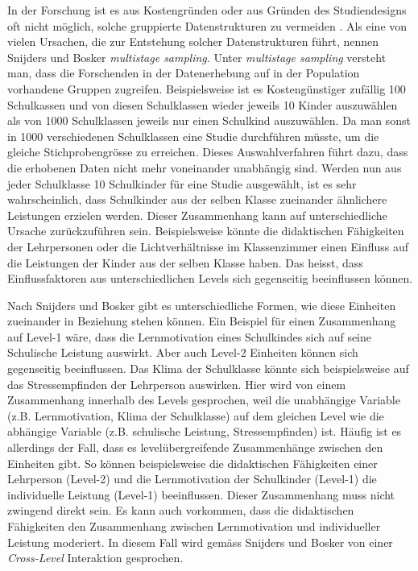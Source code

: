 \documentclass[12pt]{article}\usepackage[]{graphicx}\usepackage[]{color}
\numberwithin{equation}{section}
\begin{document}
In der Forschung ist es aus Kostengründen oder aus Gründen des Studiendesigns oft nicht möglich, solche gruppierte Datenstrukturen zu vermeiden \citep{SnijdersTomA.B2012Ma:a, woltman2012introduction}. Als eine von vielen Ursachen, die zur Entstehung solcher Datenstrukturen führt, nennen Snijders und Bosker \citeyearpar{SnijdersTomA.B2012Ma:a} \textit{multistage sampling}. Unter \textit{multistage sampling} versteht man, dass die Forschenden in der Datenerhebung auf in der Population vorhandene Gruppen zugreifen. Beispielsweise ist es Kostengünstiger zufällig 100 Schulkassen und von diesen Schulklassen wieder jeweils 10 Kinder auszuwählen als von 1000 Schulklassen jeweils nur einen Schulkind auszuwählen. Da man sonst in 1000 verschiedenen Schulklassen eine Studie durchführen müsste, um die gleiche Stichprobengrösse zu erreichen. Dieses Auswahlverfahren führt dazu, dass die erhobenen Daten nicht mehr voneinander unabhängig sind. Werden nun aus jeder Schulklasse 10 Schulkinder für eine Studie ausgewählt, ist es sehr wahrscheinlich, dass Schulkinder aus der selben Klasse zueinander ähnlichere Leistungen erzielen werden. Dieser Zusammenhang kann auf unterschiedliche Ursache zurückzuführen sein. Beispielsweise könnte die didaktischen Fähigkeiten der Lehrpersonen oder die Lichtverhältnisse im Klassenzimmer einen Einfluss auf die Leistungen der Kinder aus der selben Klasse haben. Das heisst, dass Einflussfaktoren aus unterschiedlichen Levels sich gegenseitig beeinflussen können. 

Nach Snijders und Bosker \citeyearpar{SnijdersTomA.B2012Ma:a} gibt es unterschiedliche Formen, wie diese Einheiten zueinander in Beziehung stehen können. Ein Beispiel für einen Zusammenhang auf Level-1 wäre, dass die Lernmotivation eines Schulkindes sich auf seine Schulische Leistung auswirkt. Aber auch Level-2 Einheiten können sich gegenseitig beeinflussen. Das Klima der Schulklasse könnte sich beispielsweise auf das Stressempfinden der Lehrperson auswirken. Hier wird von einem Zusammenhang innerhalb des Levels gesprochen, weil die unabhängige Variable (z.B. Lernmotivation, Klima der Schulklasse) auf dem gleichen Level wie die abhängige Variable (z.B. schulische Leistung, Stressempfinden) ist. Häufig ist es allerdings der Fall, dass es levelübergreifende Zusammenhänge zwischen den Einheiten gibt. So können beispielsweise die didaktischen Fähigkeiten einer Lehrperson (Level-2) und die Lernmotivation der Schulkinder (Level-1) die individuelle Leistung (Level-1) beeinflussen. Dieser Zusammenhang muss nicht zwingend direkt sein. Es kann auch vorkommen, dass die didaktischen Fähigkeiten den Zusammenhang zwischen Lernmotivation und individueller Leistung moderiert. In diesem Fall wird gemäss Snijders und Bosker \citeyearpar{SnijdersTomA.B2012Ma:a} von einer \textit{Cross-Level} Interaktion gesprochen.
\end{document}
